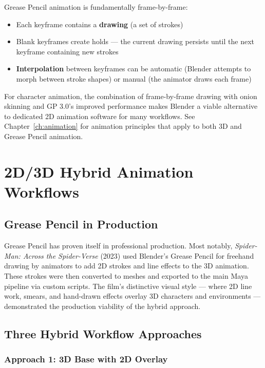 Grease Pencil animation is fundamentally frame-by-frame:

\begin{itemize}[leftmargin=2em]
  \item Each keyframe contains a \textbf{drawing} (a set of strokes)
  \item Blank keyframes create holds --- the current drawing persists until the next keyframe containing new strokes
  \item \textbf{Interpolation} between keyframes can be automatic (Blender attempts to morph between stroke shapes) or manual (the animator draws each frame)
\end{itemize}

For character animation, the combination of frame-by-frame drawing with onion skinning and GP 3.0's improved performance makes Blender a viable alternative to dedicated 2D animation software for many workflows. See Chapter~\ref{ch:animation} for animation principles that apply to both 3D and Grease Pencil animation.

\section{2D/3D Hybrid Animation Workflows}
\label{sec:hybrid-animation}

\subsection{Grease Pencil in Production}

Grease Pencil has proven itself in professional production. Most notably, \textit{Spider-Man: Across the Spider-Verse} (2023) used Blender's Grease Pencil for freehand drawing by animators to add 2D strokes and line effects to the 3D animation. These strokes were then converted to meshes and exported to the main Maya pipeline via custom scripts. The film's distinctive visual style --- where 2D line work, smears, and hand-drawn effects overlay 3D characters and environments --- demonstrated the production viability of the hybrid approach.

\subsection{Three Hybrid Workflow Approaches}

\subsubsection{Approach 1: 3D Base with 2D Overlay}

